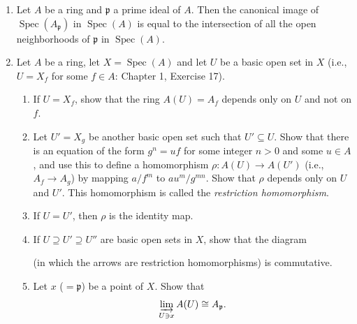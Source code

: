 \begin{enumerate}
\begin{enumerate}
\item Let $\mathfrak p$ be a prime ideal of $A$. Take $S=A-\mathfrak p$ in ii) and then reduce mod $S^{-1}\mathfrak p$ as in iii). Deduce that the subspace $f^{*-1}(\mathfrak p)$ of $Y$ is naturally homeomorphic to $\operatorname{Spec}(B_{\mathfrak p}/\mathfrak pB_{\mathfrak p})=\operatorname{Spec}(k(\mathfrak p)\otimes_A B)$, where $k(\mathfrak p)$ is the residue field of the local ring $A_{\mathfrak p}$.

$\operatorname{Spec}(k(\mathfrak p)\otimes_A B)$ is called the \textit{fiber} of $f^*$ over $\mathfrak p$.
\end{enumerate}

\item Let $A$ be a ring and $\mathfrak p$ a prime ideal of $A$. Then the canonical image of $\operatorname{Spec}(A_{\mathfrak p})$ in $\operatorname{Spec}(A)$ is equal to the intersection of all the open neighborhoods of $\mathfrak p$ in $\operatorname{Spec}(A)$.

\item Let $A$ be a ring, let $X=\operatorname{Spec}(A)$ and let $U$ be a basic open set in $X$ (i.e., $U=X_f$ for some $f\in A$: Chapter 1, Exercise 17).
\begin{enumerate}
\renewcommand{\labelenumii}{\roman{enumii})}
\item If $U=X_f$, show that the ring $A(U)=A_f$ depends only on $U$ and not on $f$.
\item Let $U'=X_g$ be another basic open set such that $U'\subseteq U$. Show that there is an equation of the form $g^n=uf$ for some integer $n>0$ and some $u\in A$, and use this to define a homomorphism $\rho:A(U)\longrightarrow A(U')$ (i.e., $A_f\longrightarrow A_g$) by mapping $a/f^m$ to $au^m/g^{mn}$. Show that $\rho$ depends only on $U$ and $U'$. This homomorphism is called the \textit{restriction homomorphism}.
\item If $U=U'$, then $\rho$ is the identity map.
\item If $U\supseteq U'\supseteq U''$ are basic open sets in $X$, show that the diagram

\begin{center}

\end{center}

(in which the arrows are restriction homomorphisms) is commutative.
\item Let $x$ ($=\mathfrak p$) be a point of $X$. Show that
\[
 \varinjlim_{U\ni x}A(U)\cong A_{\mathfrak p}.
\]
\end{enumerate}


\end{enumerate}
